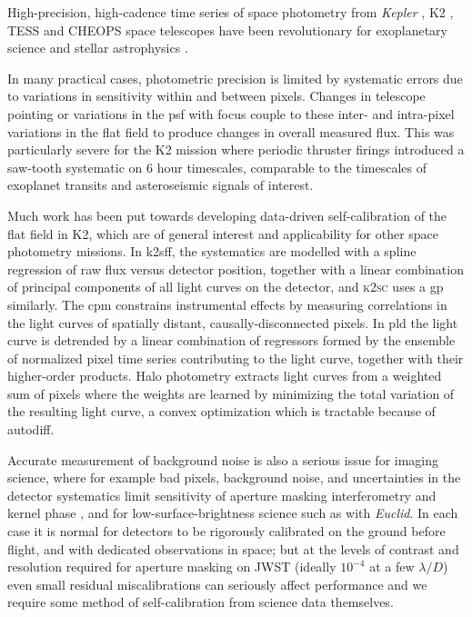 \documentclass[]{spieman}
\begin{document}
High-precision, high-cadence time series of space photometry from \textit{Kepler} \cite{Borucki2010}, K2 \cite{K2}, TESS \cite{TESS} and CHEOPS \cite{CHEOPS} space telescopes have been revolutionary for exoplanetary science \cite{Zhu2021} and stellar astrophysics \cite{Aerts21,Jackiewicz2021}. 

In many practical cases, photometric precision is limited by systematic errors due to variations in sensitivity within and between pixels. Changes in telescope pointing or variations in the \ac{psf} with focus couple to these inter- and intra-pixel variations in the flat field to produce changes in overall measured flux. This was particularly severe for the K2 mission where periodic thruster firings introduced a saw-tooth systematic on 6 hour timescales, comparable to the timescales of exoplanet transits and asteroseismic signals of interest. 

Much work has been put towards developing data-driven self-calibration of the flat field in K2, which are of general interest and applicability for other space photometry missions. 
In \ac{k2sff}, the systematics are modelled with a spline regression of raw flux versus detector position, together with a linear combination of principal components of all light curves on the detector, and \textsc{k2sc} \cite{Aigrain2016} uses a \ac{gp} similarly. 
The \ac{cpm} constrains instrumental effects by measuring correlations in the light curves of spatially distant, causally-disconnected pixels.
In \ac{pld} the light curve is detrended by a linear combination of regressors formed by the ensemble of normalized pixel time series contributing to the light curve, together with their higher-order products.
Halo photometry \cite{halo, halo2} extracts light curves from a weighted sum of pixels where the weights are learned by minimizing the total variation of the resulting light curve, a convex optimization which is tractable because of autodiff.

Accurate measurement of background noise is also a serious issue for imaging science, where for example bad pixels, background noise, and uncertainties in the detector systematics limit sensitivity of aperture masking interferometry and kernel phase \cite{Kammerer2019}, and for low-surface-brightness science such as with \textit{Euclid}\cite{EuclidCollaboration2022}. In each case it is normal for detectors to be rigorously calibrated on the ground before flight, and with dedicated observations in space; but at the levels of contrast and resolution required for aperture masking on JWST (ideally $10^{-4}$ at a few $\lambda/D$) even small residual miscalibrations can seriously affect performance \cite{Sivaramakrishnan2022} and we require some method of self-calibration from science data themselves.
\end{document}
